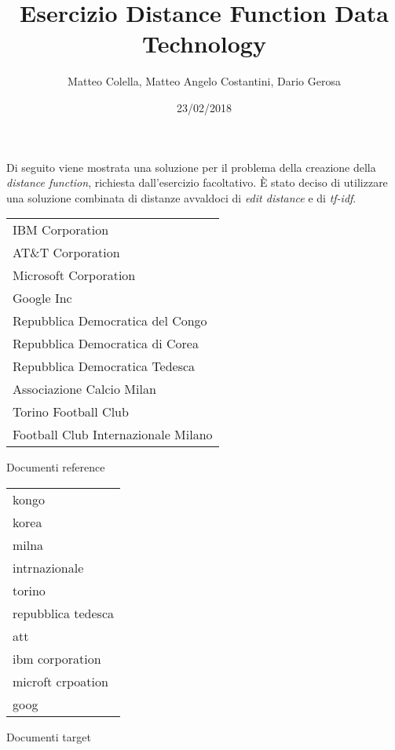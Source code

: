 \documentclass[a4paper,12pt,openany,oneside]{article}
\title{Esercizio Distance Function Data Technology}
\author{Matteo Colella, Matteo Angelo Costantini, Dario Gerosa}
\date{23/02/2018}
\begin{document}
\selectfont
\maketitle
\pagebreak

Di seguito viene mostrata una soluzione per il problema della creazione della \textit{distance function}, richiesta dall'esercizio facoltativo. È stato deciso di utilizzare una soluzione combinata di distanze avvaldoci di \textit{edit distance} e di \textit{tf-idf}. 
\\[1em]
\begin{table}[ht]
	\small
	\centering
	\begin{minipage}{0.5\linewidth}
		\centering
		\begin{tabularx}{0.9\textwidth}{l}
			\toprule
			IBM Corporation\\
			AT\&T Corporation\\
			Microsoft Corporation\\
			Google Inc\\
			Repubblica Democratica del Congo\\
			Repubblica Democratica di Corea\\
			Repubblica Democratica Tedesca\\
			Associazione Calcio Milan\\
			Torino Football Club\\
			Football Club Internazionale Milano\\
			\bottomrule
		\end{tabularx}
		 {Documenti reference}
		\label{table:reference}
	\end{minipage}%
	\begin{minipage}{0.5\linewidth}
	\centering
	\begin{tabularx}{0.55\textwidth}{l}
		\toprule
		kongo\\
		korea\\
		milna\\
		intrnazionale\\
		torino\\
		repubblica tedesca\\
		att\\
		ibm corporation\\
		microft crpoation\\
		goog\\
		\bottomrule
	\end{tabularx}
	 {Documenti target}
	\label{table:target}
\end{minipage}
\end{table}
\end{document}
